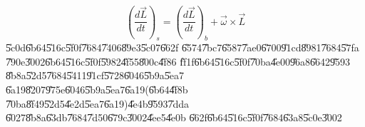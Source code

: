 \documentclass[12pt,a4paper]{article}
\begin{document}
\begin{equation}
\left( \frac{d\vec{L}}{dt}\right) _{s}=\left( \frac{d\vec{L}}{dt}\right)
_{b}+\vec{\omega}\times \vec{L}  \label{eq1}
\end{equation}%
\U{5c0d}\U{6b64}\U{516c}\U{5f0f}\U{7684}\U{7406}\U{89e3}\U{5c07}\U{662f}%
\U{6574}\U{7bc7}\U{6587}\U{7ae0}\U{6700}\U{91cd}\U{8981}\U{7684}\U{57fa}%
\U{790e}\U{3002}\U{6b64}\U{516c}\U{5f0f}\U{5982}\U{4f55}\U{800c}\U{4f86}%
\U{ff1f}\U{6b64}\U{516c}\U{5f0f}\U{70ba}\U{4e00}\U{96a8}\U{6642}\U{9593}%
\U{8b8a}\U{52d5}\U{7684}\U{5411}\U{91cf}\U{5728}\U{6046}\U{5b9a}\U{5ea7}%
\U{6a19}\U{8207}\U{975e}\U{6046}\U{5b9a}\U{5ea7}\U{6a19}(\U{6b64}\U{4f8b}%
\U{70ba}\U{8f49}\U{52d5}\U{4e2d}\U{5ea7}\U{6a19})\U{4e4b}\U{9593}\U{7dda}%
\U{6027}\U{8b8a}\U{63db}\U{7684}\U{7d50}\U{679c}\U{3002}\U{4ee5}\U{4e0b}%
\U{662f}\U{6b64}\U{516c}\U{5f0f}\U{7684}\U{63a8}\U{5c0e}\U{3002}

\begin{figure}[th]
\caption{{}}
\label{firstfig}
\begin{center}
\fbox{}
\end{center}
\end{figure}
\bigskip
\end{document}
